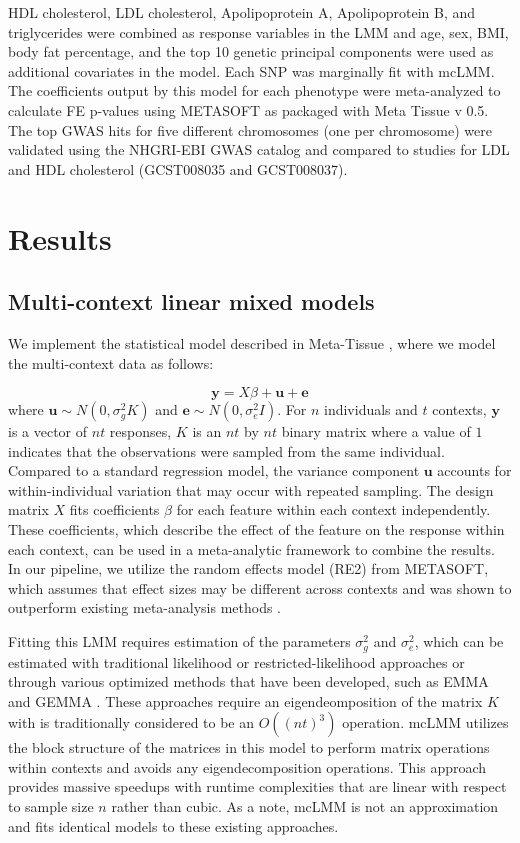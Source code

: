         HDL cholesterol, LDL cholesterol, Apolipoprotein A, Apolipoprotein B, and triglycerides were combined as response variables in the LMM and age, sex, BMI, body fat percentage, and the top 10 genetic principal components were used as additional covariates in the model. Each SNP was marginally fit with mcLMM. The coefficients output by this model for each phenotype were meta-analyzed to calculate FE p-values using METASOFT as packaged with Meta Tissue v 0.5. The top GWAS hits for five different chromosomes (one per chromosome) were validated using the NHGRI-EBI GWAS catalog \cite{GWAS_catalog} and compared to studies for LDL and HDL cholesterol (GCST008035 and GCST008037).
        
\section{Results}

    \subsection{Multi-context linear mixed models}
        We implement the statistical model described in Meta-Tissue  \cite{Sul}, where we model the multi-context data as follows:
        
        \begin{equation}
            \mathbf{y} = X\beta + \mathbf{u} + \mathbf{e}
        \end{equation}
        where $\mathbf{u} \sim N(0,\sigma_g^2 K)$ and $\mathbf{e} \sim N(0,\sigma_e^2 I)$. For $n$ individuals and $t$ contexts, $\mathbf{y}$ is a vector of $nt$ responses, $K$ is an $nt$ by $nt$ binary matrix where a value of $1$ indicates that the observations were sampled from the same individual. Compared to a standard regression model, the variance component $\mathbf{u}$ accounts for within-individual variation that may occur with repeated sampling. The design matrix $X$ fits coefficients $\beta$ for each feature within each context independently. These coefficients, which describe the effect of the feature on the response within each context, can be used in a meta-analytic framework to combine the results. In our pipeline, we utilize the random effects model (RE2) from METASOFT, which assumes that effect sizes may be different across contexts and was shown to outperform existing meta-analysis methods \cite{Metasoft}.
        
        Fitting this LMM requires estimation of the parameters $\sigma^2_g$ and $\sigma^2_e$, which can be estimated with traditional likelihood or restricted-likelihood approaches or through various optimized methods that have been developed, such as EMMA and GEMMA \cite{Kang, Zhou}. These approaches require an eigendeomposition of the matrix $K$ with is traditionally considered to be an $O((nt)^3)$ operation. mcLMM utilizes the block structure of the matrices in this model to perform matrix operations within contexts and avoids any eigendecomposition operations. This approach provides massive speedups with runtime complexities that are linear with respect to sample size $n$ rather than cubic. As a note, mcLMM is not an approximation and fits identical models to these existing approaches.
    

